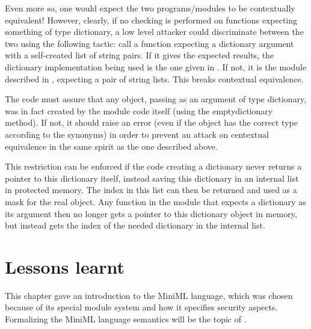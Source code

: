 Even more so, one would expect the two programs/modules to be contextually equivalent! However, clearly, if no checking is performed on functions expecting something of type dictionary, a low level attacker could discriminate between the two using the following tactic: call a function expecting a dictionary argument with a self-created list of string pairs. If it gives the expected results, the dictionary implementation being used is the one given in . If not, it is the module described in , expecting a pair of string lists. This breaks contextual equivalence.

The code must assure that any object, passing as an argument of type dictionary, was in fact created by the module code itself (using the emptydictionary method). If not, it should raise an error (even if the object has the correct type according to the synonyms) in order to prevent an attack on centextual equivalence in the same spirit as the one described above.

This restriction can be enforced if the code creating a dictionary never returns a pointer to this dictionary itself, instead saving this dictionary in an internal list in protected memory. The index in this list can then be returned and used as a mask for the real object. Any function in the module that expects a dictionary as its argument then no longer gets a pointer to this dictionary object in memory, but instead gets the index of the needed dictionary in the internal list.


\section{Lessons learnt}

This chapter gave an introduction to the \mbox{MiniML} language, which was chosen because of its special module system and how it specifies security aspects. Formalizing the \mbox{MiniML} language semantics will be the topic of \label{chapter:formalspecification}.

